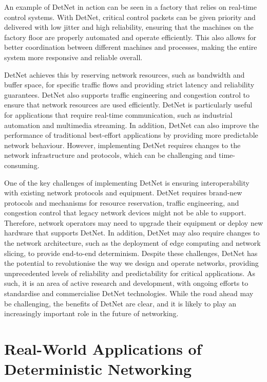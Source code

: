 \documentclass[runningheads]{llncs}
\begin{document}
An example of DetNet in action can be seen in a factory that relies on real-time control systems. With DetNet, critical control packets can be given priority and delivered with low jitter and high reliability, ensuring that the machines on the factory floor are properly automated and operate efficiently. This also allows for better coordination between different machines and processes, making the entire system more responsive and reliable overall.

DetNet achieves this by reserving network resources, such as bandwidth and buffer space, for specific traffic flows and providing strict latency and reliability guarantees. DetNet also supports traffic engineering and congestion control to ensure that network resources are used efficiently. DetNet is particularly useful for applications that require real-time communication, such as industrial automation and multimedia streaming. In addition, DetNet can also improve the performance of traditional best-effort applications by providing more predictable network behaviour. However, implementing DetNet requires changes to the network infrastructure and protocols, which can be challenging and time-consuming.

One of the key challenges of implementing DetNet is ensuring interoperability with existing network protocols and equipment. DetNet requires brand-new protocols and mechanisms for resource reservation, traffic engineering, and congestion control that legacy network devices might not be able to support. Therefore, network operators may need to upgrade their equipment or deploy new hardware that supports DetNet. In addition, DetNet may also require changes to the network architecture, such as the deployment of edge computing and network slicing, to provide end-to-end determinism. Despite these challenges, DetNet has the potential to revolutionise the way we design and operate networks, providing unprecedented levels of reliability and predictability for critical applications. As such, it is an area of active research and development, with ongoing efforts to standardise and commercialise DetNet technologies. While the road ahead may be challenging, the benefits of DetNet are clear, and it is likely to play an increasingly important role in the future of networking.

\section{Real-World Applications of Deterministic Networking}
\end{document}
